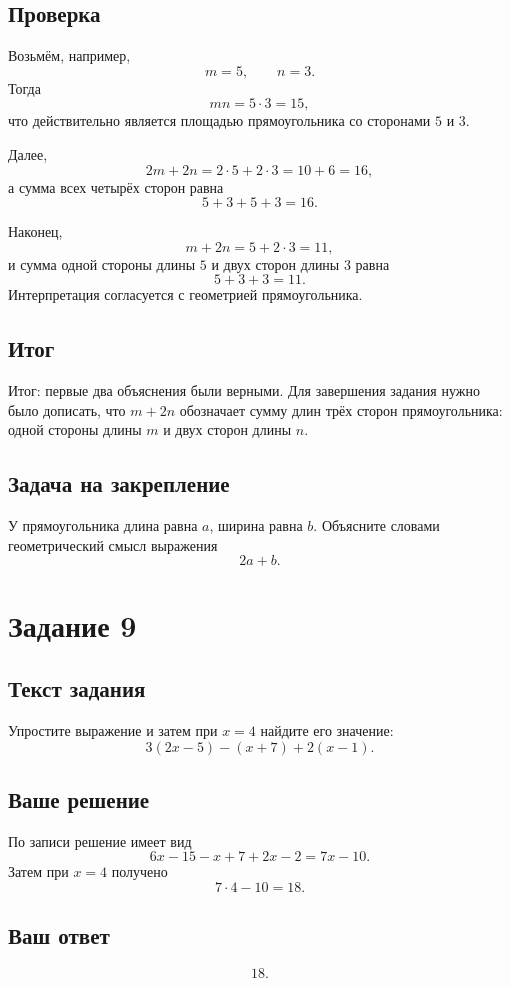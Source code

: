 \documentclass[12pt,a4paper]{article}
\begin{document}
\subsection*{Проверка}
Возьмём, например,
\[
m=5,\qquad n=3.
\]
Тогда
\[
mn=5\cdot3=15,
\]
что действительно является площадью прямоугольника со сторонами $5$ и $3$.

Далее,
\[
2m+2n=2\cdot5+2\cdot3=10+6=16,
\]
а сумма всех четырёх сторон равна
\[
5+3+5+3=16.
\]

Наконец,
\[
m+2n=5+2\cdot3=11,
\]
и сумма одной стороны длины $5$ и двух сторон длины $3$ равна
\[
5+3+3=11.
\]
Интерпретация согласуется с геометрией прямоугольника.

\subsection*{Итог}
\textcolor{teal!60!black}{Итог:} первые два объяснения были верными. Для завершения задания нужно было дописать, что $m+2n$ обозначает сумму длин трёх сторон прямоугольника: одной стороны длины $m$ и двух сторон длины $n$.

\subsection*{Задача на закрепление}
У прямоугольника длина равна $a$, ширина равна $b$. Объясните словами геометрический смысл выражения
\[
2a+b.
\]

\newpage
{}\label{task:9}
\section*{Задание 9}

\subsection*{Текст задания}
Упростите выражение и затем при $x=4$ найдите его значение:
\[
3(2x-5)-(x+7)+2(x-1).
\]

\subsection*{Ваше решение}
По записи решение имеет вид
\[
6x-15-x+7+2x-2=7x-10.
\]
Затем при $x=4$ получено
\[
7\cdot4-10=18.
\]

\subsection*{Ваш ответ}
\[
18.
\]
\end{document}
